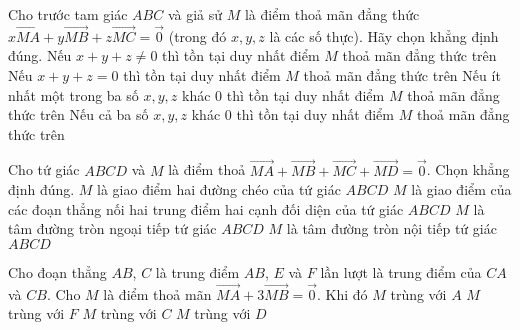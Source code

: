 \begin{ex}%
	Cho trước tam giác $ABC$ và giả sử $M$ là điểm thoả mãn đẳng thức $x\vec{MA}+y\vec{MB}+z\vec{MC}=\vec{0}$ (trong đó $x, y, z$ là các số thực). Hãy chọn khẳng định đúng.
	\choice
	{\True Nếu $x+y+z \ne 0$ thì tồn tại duy nhất điểm $M$ thoả mãn đẳng thức trên}
	{Nếu $x+y+z = 0$ thì tồn tại duy nhất điểm $M$ thoả mãn đẳng thức trên}
	{Nếu ít nhất một trong ba số $x, y, z$ khác $0$ thì tồn tại duy nhất điểm $M$ thoả mãn đẳng thức trên}
	{Nếu cả ba số $x, y, z$ khác $0$ thì tồn tại duy nhất điểm $M$ thoả mãn đẳng thức trên}
\end{ex}

\begin{ex}%
	Cho tứ giác $ABCD$ và $M$ là điểm thoả $\vec{MA}+\vec{MB}+\vec{MC}+\vec{MD}=\vec{0}$. Chọn khẳng định đúng.
	\choice
	{$M$ là giao điểm hai đường chéo của tứ giác $ABCD$}
	{\True $M$ là giao điểm của các đoạn thẳng nối hai trung điểm hai cạnh đối diện của tứ giác $ABCD$}
	{$M$ là tâm đường tròn ngoại tiếp tứ giác $ABCD$}
	{$M$ là tâm đường tròn nội tiếp tứ giác $ABCD$}
\end{ex}

\begin{ex}%
	Cho đoạn thẳng $AB$, $C$ là trung điểm $AB$, $E$ và $F$ lần lượt là trung điểm của $CA$ và $CB$. Cho $M$ là điểm thoả mãn $\vec{MA}+3\vec{MB}=\vec{0}$. Khi đó
	\choice
	{$M$ trùng với $A$}
	{\True $M$ trùng với $F$}
	{$M$ trùng với $C$}
	{$M$ trùng với $D$}
\end{ex}

